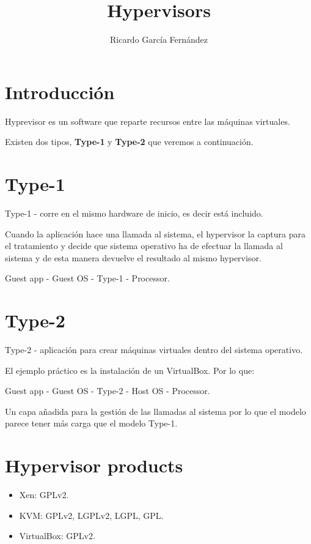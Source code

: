 \documentclass[11pt]{article}
\title{\textbf{Hypervisors}}
\author{Ricardo Garc\'ia Fern\'andez}
\date{}
\begin{document}
\maketitle

\section{Introducci\'on}

Hyprevisor es un software que reparte recursos entre las máquinas virtuales.

Existen dos tipos, \textbf{Type-1} y \textbf{Type-2} que veremos a continuación.

\section{Type-1}

Type-1 - corre en el mismo hardware de inicio, es decir está incluido.

Cuando la aplicación hace una llamada al sistema, el hypervisor la captura para el tratamiento y decide que sistema operativo ha de efectuar la llamada al sistema y de esta manera devuelve el resultado al mismo hypervisor.

Guest app - Guest OS - Type-1 - Processor.

\section{Type-2}

Type-2 - aplicación para crear máquinas virtuales dentro del sistema operativo.

El ejemplo práctico es la instalación de un VirtualBox. Por lo que:

    Guest app - Guest OS - Type-2 - Host OS - Processor.

Un capa añadida para la gestión de las llamadas al sistema por lo que el modelo parece tener más carga que el modelo Type-1.

\section{Hypervisor products}

\begin{itemize}
    \item Xen: GPLv2.
    \item KVM: GPLv2, LGPLv2, LGPL, GPL.
    \item VirtualBox: GPLv2. 
\end{itemize}
\end{document}
